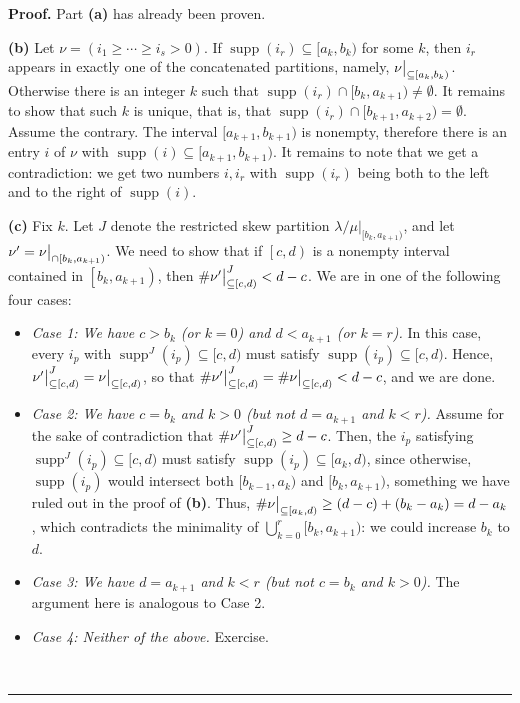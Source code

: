 \documentclass[12pt]{article}
\theoremstyle{plain}
\theoremstyle{definition}
\newenvironment{proof}[1][Proof]{\noindent\textbf{#1.} }{\ \rule{0.5em}{0.5em}}
\def\seplistvar{{{\nu}}} %
\def\supp{{\operatorname{supp}}}
\def\lm{{\lambda/\mu}}
\begin{document}
\begin{proof}
Part \textbf{(a)} has already been proven.

\textbf{(b)} Let $\nu=(i_1\geq\cdots\geq i_s>0)$. If $\supp(i_r)\subseteq [a_k,b_k)$ for some $k$, then $i_r$ appears in exactly one of the concatenated partitions, namely, $\nuxy{a_k}{b_k}$. Otherwise there is an integer $k$ such that $\supp(i_r)\cap [b_k,a_{k+1})\neq\emptyset$. It remains to show that such $k$ is unique, that is, that $\supp(i_r)\cap [b_{k+1},a_{k+2})=\emptyset$. Assume the contrary. The interval $[a_{k+1},b_{k+1})$ is nonempty, therefore there is an entry $i$ of $\nu$ with $\supp(i)\subseteq [a_{k+1},b_{k+1})$. It remains to note that we get a contradiction: we get two numbers $i,i_r$ with $\supp(i_r)$ being both to the left and to the right of $\supp(i)$. 

\textbf{(c)} Fix $k$. Let $J$ denote the restricted skew partition $\lm\big|_{[b_k,a_{k+1})}$, and let $\seplistvar^{\prime} = \nuxycap{b_k}{a_{k+1}}$.
We need to show that if $\left[c,d\right)$ is a nonempty interval contained in $\left[b_k, a_{k+1}\right)$, then $\#\nupxy{c}{d}^{J} < d-c$. We are in one of the following four cases:

\begin{itemize}
\item \textit{Case 1: We have $c> b_k$ (or $k=0$) and $d< a_{k+1}$ (or $k=r$).} In this case, every $i_p$ with $\supp^J(i_p) \subseteq [c,d)$ must satisfy $\supp(i_p) \subseteq [c,d)$. Hence, $\nupxy{c}{d}^{J} = \nuxy{c}{d}$, so that $\#\nupxy{c}{d}^{J} = \#\nuxy{c}{d} < d-c$, and we are done.
\item \textit{Case 2: We have $c=b_k$ and $k>0$ (but not $d=a_{k+1}$ and $k<r$).} Assume for the sake of contradiction that $\#\nupxy{c}{d}^{J} \geq d-c$. Then, the $i_p$ satisfying $\supp^J(i_p) \subseteq [c,d)$ must satisfy $\supp(i_p) \subseteq [a_k, d)$, since otherwise, $\supp(i_p)$ would intersect both $[b_{k-1}, a_k)$ and $[b_k, a_{k+1})$, something we have ruled out in the proof of \textbf{(b)}. Thus, $\#\nuxy{a_k}{d} \geq (d-c)+(b_k-a_k) = d-a_k$, which contradicts the minimality of $\bigcup_{k=0}^{r}[b_k,a_{k+1})$: we could increase $b_k$ to $d$.
\item \textit{Case 3: We have $d=a_{k+1}$ and $k<r$ (but not $c=b_k$ and $k>0$).} The argument here is analogous to Case 2.
\item \textit{Case 4: Neither of the above.} Exercise.
\end{itemize}
\end{proof}
\end{document}
